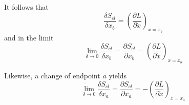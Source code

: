 It follows that
\begin{equation*}
\frac{\delta S_{cl}}{\delta x_b}
=\left(\frac{\partial L}{\partial\dot x}\right)_{x=x_b}
\end{equation*}
and in the limit
\begin{equation*}
\lim_{\delta\rightarrow0}\frac{\delta S_{cl}}{\delta x_b}=\frac{\partial S_{cl}}{\partial x_b}
=\left(\frac{\partial L}{\partial\dot x}\right)_{x=x_b}
\end{equation*}

Likewise, a change of endpoint $a$ yields
\begin{equation*}
\lim_{\delta\rightarrow0}\frac{\delta S_{cl}}{\delta x_a}=\frac{\partial S_{cl}}{\partial x_a}
=-\left(\frac{\partial L}{\partial\dot x}\right)_{x=x_a}
\end{equation*}


